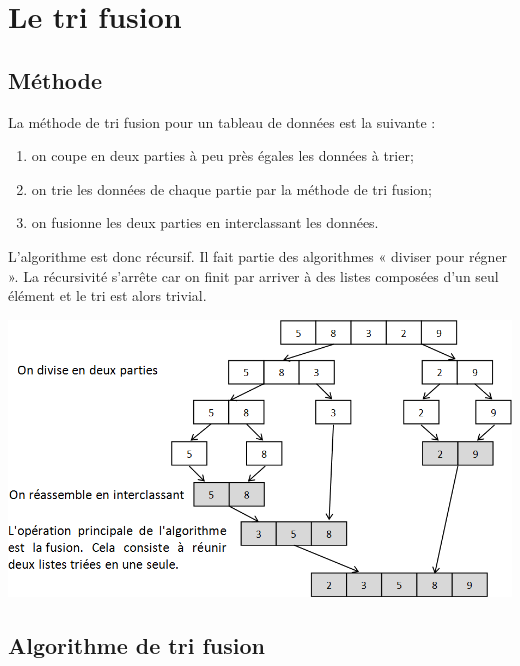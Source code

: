 \documentclass[10pt,fleqn]{article} %
\begin{document}
\section{Le tri fusion}
\subsection{Méthode}
\begin{minipage}[c]{.48\linewidth}
La méthode de tri fusion pour un tableau de données est la suivante :
\begin{enumerate}
\item on coupe en deux parties à peu près égales les données à trier;
\item on trie les données de chaque partie par la méthode de tri fusion;
\item on fusionne les deux parties en interclassant les données.
\end{enumerate}

L'algorithme est donc récursif. Il fait partie des algorithmes « diviser pour régner ». La récursivité s'arrête car on finit par arriver à des listes composées d'un seul élément et le tri est alors trivial. 


\end{minipage} \hfill
\begin{minipage}[c]{.48\linewidth}
\begin{center}
\includegraphics[width=\linewidth]{images/graphe_2}
\end{center}
\end{minipage}



\subsection{Algorithme de tri fusion}
\end{document}
